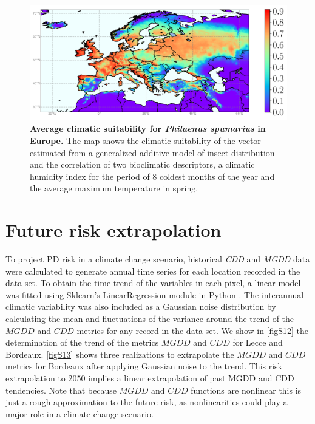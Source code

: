 \begin{figure}[H]
    \centering
    \includegraphics[width=1\textwidth]{Figures/vector_layer.png}
    \caption[Average climatic suitability for \textit{Philaenus
            spumarius} in Europe]{\textbf{Average climatic suitability for
            \textit{Philaenus
                spumarius} in Europe.} The map shows the climatic suitability
        of the vector
        estimated from a generalized additive model of insect distribution and
        the
        correlation of two bioclimatic descriptors, a climatic humidity index
        for the
        period of 8 coldest months of the year and the average maximum
        temperature in
        spring.}
    \label{fig:sup_vector} %
\end{figure}

\section{Future risk extrapolation}\label{app:future}

To project PD risk in a climate change scenario, historical \textit{CDD}
and \textit{MGDD} data were calculated to generate annual time series for each
location recorded in the data set. To obtain the time trend of the variables in
each pixel, a linear model was fitted using Sklearn's LinearRegression module
in Python \cite{scikit-learn}. The interannual climatic variability was also
included as a Gaussian noise distribution by calculating the mean and
fluctuations of the variance around the trend of the $MGDD$ and $CDD$ metrics
for any record in the data set. We show in \cref{figS12} the determination of
the trend of the metrics $MGDD$ and $CDD$ for Lecce and Bordeaux. \cref{figS13}
shows three realizations to extrapolate the $MGDD$ and $CDD$ metrics for
Bordeaux after applying Gaussian noise to the trend. This risk extrapolation to
2050 implies a linear extrapolation of past MGDD and CDD tendencies. Note that
because $MGDD$ and $CDD$ functions are nonlinear this is just a rough
approximation to the future risk, as nonlinearities could play a major role in
a climate change scenario.

